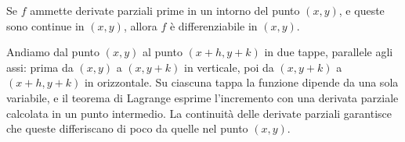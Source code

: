 \begin{teorema}\label{teo:differenziale}
Se $f$ ammette derivate parziali prime in un intorno del punto $(x,y)$, e queste sono
continue in $(x,y)$, allora $f$ è differenziabile in $(x,y)$.
\end{teorema}

\begin{schema}
\end{schema}

\begin{strategia}
Andiamo dal punto $(x,y)$ al punto $(x+h,y+k)$ in due tappe, parallele agli assi:
prima da $(x,y)$ a $(x,y+k)$ in verticale, poi da $(x,y+k)$ a $(x+h,y+k)$ in
orizzontale. Su ciascuna tappa la funzione dipende da una sola variabile, e il teorema di
Lagrange esprime l'incremento con una derivata parziale calcolata in un punto
intermedio. La continuità delle derivate parziali garantisce che queste differiscano di
poco da quelle nel punto $(x,y)$.
\end{strategia}

